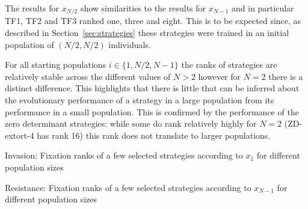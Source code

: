\documentclass[10pt,journal]{IEEEtran}
\begin{document}
The results for \(x_{N/2}\) show similarities to the results for \(x_{N-1}\) and
in particular TF1, TF2 and TF3 ranked one, three and eight. This is to be
expected since, as described in Section~\ref{sec:strategies} these strategies
were trained in an initial population of \((N/2, N/2)\) individuals.

For all starting populations
\(i\in\{1, N/2, N-1\}\) the ranks of strategies are relatively stable across the
different values of \(N>2\) however for \(N=2\) there is a distinct difference.
This highlights that there is little that can be inferred about the evolutionary
performance of a strategy in a large population from its performance in a small
population. This is confirmed by the performance of the zero determinant strategies: while
some do rank relatively highly for \(N=2\) (ZD-extort-4 has rank 16) this rank
does not translate to larger populations.

\begin{table}[!hbtp]
    \centering
    \scriptsize
    \scalebox{0.7}{}
    \caption{Invasion: Fixation ranks of a few selected strategies according to \(x_1\) for different
    population sizes}
    \label{tbl:ranks_v_size_invade}
\end{table}

\begin{table}[!hbtp]
    \centering
    \scriptsize
    \scalebox{0.7}{}
    \caption{Resistance: Fixation ranks of a few selected strategies according to \(x_{N-1}\) for different
    population sizes}
    \label{tbl:ranks_v_size_resist}
\end{table}
\end{document}
